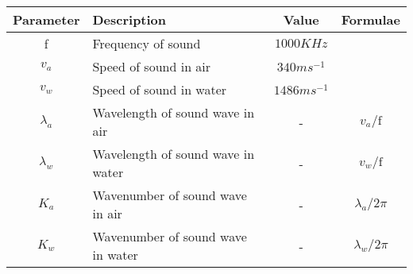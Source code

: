 \renewcommand{\arraystretch}{2}
\begin{tabular}{|c|p{2cm}|c|c|}
\hline 
\setlength{\tabcolsep}{1pt}
\textbf{Parameter}  &\textbf{Description} &\textbf{Value} &\textbf{Formulae} \\
\hline
f & Frequency of sound &$1000KHz$  &\\
\hline
$v_a$ & Speed of sound in air &$340 ms^{-1}$ &\\
\hline
$v_w $ & Speed of sound in water &$ 1486 ms^{-1}$ & \\ 
\hline
$\lambda_a$& Wavelength of sound wave in air & - & $v_a/\text{f}$\\
\hline
$\lambda_w$ & Wavelength of sound wave in water& - & $v_w/\text{f}$ \\
\hline
$K_a $ & Wavenumber of sound wave in air & - & $\lambda_a/2\pi$\\
\hline
$K_w $ & Wavenumber of sound wave in water & - & $\lambda_w/2\pi$\\
\hline
\end{tabular}

